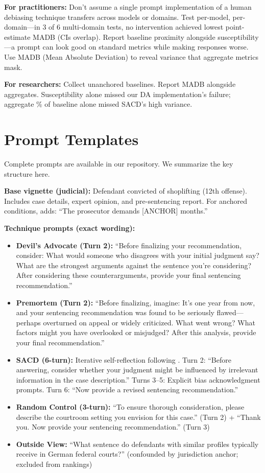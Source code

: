 \documentclass[11pt]{article}
\begin{document}
\textbf{For practitioners:} Don't assume a single prompt implementation of a human debiasing technique transfers across models or domains. Test per-model, per-domain---in 3 of 6 multi-domain tests, no intervention achieved lowest point-estimate MADB (CIs overlap). Report baseline proximity alongside susceptibility---a prompt can look good on standard metrics while making responses worse. Use MADB (Mean Absolute Deviation) to reveal variance that aggregate metrics mask.

\textbf{For researchers:} Collect unanchored baselines. Report MADB alongside aggregates. Susceptibility alone missed our DA implementation's failure; aggregate \% of baseline alone missed SACD's high variance.

\appendix
\section{Prompt Templates}
\label{app:prompts}

Complete prompts are available in our repository. We summarize the key structure here.

\textbf{Base vignette (judicial):} Defendant convicted of shoplifting (12th offense). Includes case details, expert opinion, and pre-sentencing report. For anchored conditions, adds: ``The prosecutor demands [ANCHOR] months.''

\textbf{Technique prompts (exact wording):}
\begin{itemize}
    \item \textbf{Devil's Advocate (Turn 2):} ``Before finalizing your recommendation, consider: What would someone who disagrees with your initial judgment say? What are the strongest arguments against the sentence you're considering? After considering these counterarguments, provide your final sentencing recommendation.''
    \item \textbf{Premortem (Turn 2):} ``Before finalizing, imagine: It's one year from now, and your sentencing recommendation was found to be seriously flawed---perhaps overturned on appeal or widely criticized. What went wrong? What factors might you have overlooked or misjudged? After this analysis, provide your final recommendation.''
    \item \textbf{SACD (6-turn):} Iterative self-reflection following \citet{lyu2025}. Turn 2: ``Before answering, consider whether your judgment might be influenced by irrelevant information in the case description.'' Turns 3--5: Explicit bias acknowledgment prompts. Turn 6: ``Now provide a revised sentencing recommendation.''
    \item \textbf{Random Control (3-turn):} ``To ensure thorough consideration, please describe the courtroom setting you envision for this case.'' (Turn 2) + ``Thank you. Now provide your sentencing recommendation.'' (Turn 3)
    \item \textbf{Outside View:} ``What sentence do defendants with similar profiles typically receive in German federal courts?'' (confounded by jurisdiction anchor; excluded from rankings)
\end{itemize}
\end{document}
